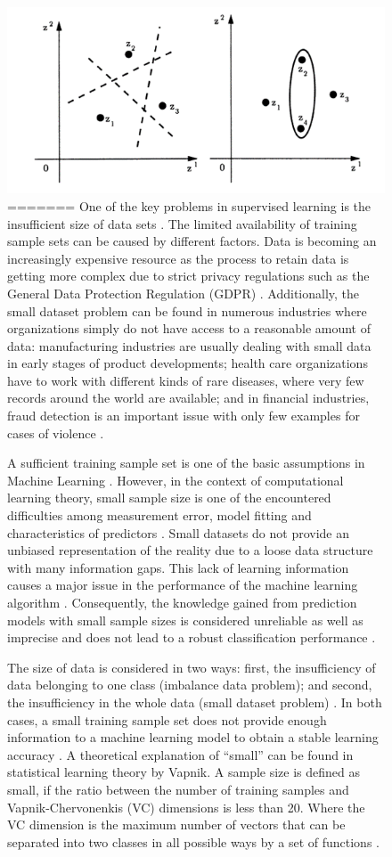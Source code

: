 \documentclass[parskip=full]{scrartcl}
\begin{document}
\begin{figure}[h]
	\centering
	\includegraphics[width=0.6\linewidth]{"VC Dimension"}
=======
One of the key problems in supervised learning is the insufficient size of data
sets \cite{Niyogi.1998}. The limited availability of training sample sets can be
caused by different factors. Data is becoming an increasingly expensive resource
\cite{Li.2007} as the process to retain data is getting more complex due to
strict privacy regulations such as the General Data Protection Regulation (GDPR)
\cite{EuropeanCommission.2019}. Additionally, the small dataset problem can be
found in numerous industries where organizations simply do not have access to a
reasonable amount of data: manufacturing industries are usually dealing with
small data in early stages of product developments; health care organizations
have to work with different kinds of rare diseases, where very few records
around the world are available; and in financial industries, fraud detection is
an important issue with only few examples for cases of violence
\cite{AbdulLateh.2017}.

A sufficient training sample set is one of the basic assumptions in Machine
Learning \cite{Ivanescu.2006}. However, in the context of computational learning
theory, small sample size is one of the encountered difficulties among
measurement error, model fitting and characteristics of predictors
\cite{AbdulLateh.2017}. Small datasets do not provide an unbiased representation
of the reality due to a loose data structure with many information gaps. This
lack of learning information causes a major issue in the performance of the
machine learning algorithm \cite{Lin.2018}. Consequently, the knowledge gained
from prediction models with small sample sizes is considered unreliable as well
as imprecise and does not lead to a robust classification performance
\cite{AbdulLateh.2017}.

The size of data is considered in two ways: first, the insufficiency of data
belonging to one class (imbalance data problem); and second, the insufficiency
in the whole data (small dataset problem) \cite{Sezer.2014}. In both cases, a
small training sample set does not provide enough information to a machine
learning model to obtain a stable learning accuracy \cite{Tsai.2008}. A
theoretical explanation of “small” can be found in statistical learning theory
by Vapnik. A sample size is defined as small, if the ratio between the number of
training samples and Vapnik-Chervonenkis (VC) dimensions is less than 20. Where
the VC dimension is the maximum number of vectors that can be separated into two
classes in all possible ways by a set of functions \cite{Vapnik.2008}. 


\end{figure}
\end{document}
